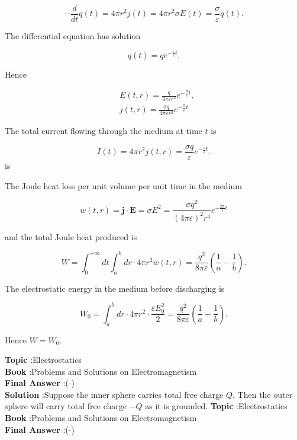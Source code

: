 \documentclass[10pt]{article}
\begin{document}
$$
-\frac{d}{d t} q(t)=4 \pi r^{2} j(t)=4 \pi r^{2} \sigma E(t)=\frac{\sigma}{\varepsilon} q(t) .
$$

The differential equation has solution

$$
q(t)=q e^{-\frac{\varepsilon}{\epsilon} t} .
$$

Hence

$$
\begin{aligned}
&E(t, r)=\frac{q}{4 \pi \varepsilon r^{2}} e^{-\frac{\sigma}{\epsilon} t}, \\
&j(t, r)=\frac{\sigma q}{4 \pi \varepsilon r^{2}} e^{-\frac{\pi}{\varepsilon} t}
\end{aligned}
$$

The total current flowing through the medium at time $t$ is

$$
I(t)=4 \pi r^{2} j(t, r)=\frac{\sigma q}{\varepsilon} e^{-\frac{\varepsilon}{\varepsilon} t} .
$$
is

 The Joule heat loss per unit volume per unit time in the medium

$$
w(t, r)=\mathbf{j} \cdot \mathbf{E}=\sigma E^{2}=\frac{\sigma q^{2}}{(4 \pi \varepsilon)^{2} r^{4}} e^{-\frac{2 \sigma}{\epsilon} t}
$$

and the total Joule heat produced is

$$
W=\int_{0}^{+\infty} d t \int_{a}^{b} d r \cdot 4 \pi r^{2} w(t, r)=\frac{q^{2}}{8 \pi \varepsilon}\left(\frac{1}{a}-\frac{1}{b}\right) .
$$

The electrostatic energy in the medium before discharging is

$$
W_{0}=\int_{a}^{b} d r \cdot 4 \pi r^{2} \cdot \frac{\varepsilon E_{0}^{2}}{2}=\frac{q^{2}}{8 \pi \varepsilon}\left(\frac{1}{a}-\frac{1}{b}\right) .
$$

Hence $W=W_{0}$. 

\textbf{Topic} :Electrostatics\\
\textbf{Book} :Problems and Solutions on Electromagnetism\\
\textbf{Final Answer} :\left(-\right)\\


\textbf{Solution} :Suppose the inner sphere carries total free charge $Q$. Then the outer sphere will carry total free charge $-Q$ as it is grounded.
\textbf{Topic} :Electrostatics\\
\textbf{Book} :Problems and Solutions on Electromagnetism\\
\textbf{Final Answer} :\left(-\right)\\
\end{document}
